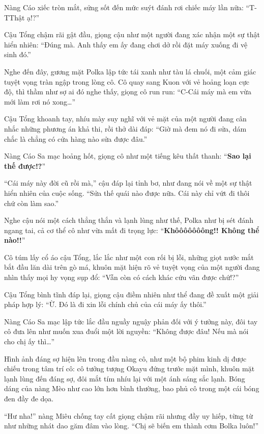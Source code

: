 \documentclass[../main.tex]{subfiles}
\begin{document}
Nàng Cáo xiếc tròn mắt, sửng sốt đến mức suýt đánh rơi chiếc máy lần nữa: ``T-TThật ạ!?''

Cậu Tổng chậm rãi gật đầu, giọng cậu như một người đang xác nhận một sự thật hiển nhiên: ``Đúng mà. Anh thấy em ấy đang chơi dở rồi đặt máy xuống đi vệ sinh đó.''

Nghe đến đây, gương mặt Polka lập tức tái xanh như tàu lá chuối, một cảm giác tuyệt vọng tràn ngập trong lòng cô. Cô quay sang Kuon với vẻ hoảng loạn cực độ, thì thầm như sợ ai đó nghe thấy, giọng cô run run: ``C-Cái máy mà em vừa mới làm rơi nó xong\dots''

Cậu Tổng khoanh tay, nhíu mày suy nghĩ với vẻ mặt của một người đang cân nhắc những phương án khả thi, rồi thở dài đáp: ``Giờ mà đem nó đi sửa, dám chắc là chẳng có cửa hàng nào sửa được đâu.''

Nàng Cáo Sa mạc hoảng hốt, giọng cô như một tiếng kêu thất thanh: ``\textbf{Sao lại thế được!?}''

``Cái máy này đời cũ rồi mà,'' cậu đáp lại tỉnh bơ, như đang nói về một sự thật hiển nhiên của cuộc sống. ``Sửa thế quái nào được nữa. Cái này chỉ vứt đi thôi chứ còn làm sao.''

Nghe cậu nói một cách thẳng thắn và lạnh lùng như thế, Polka như bị sét đánh ngang tai, cả cơ thể cô như vừa mất đi trọng lực: ``\textbf{Khôôôôôôông!! Không thể nào!!}''

Cô túm lấy cổ áo cậu Tổng, lắc lắc như một con rối bị lỗi, những giọt nước mắt bắt đầu lăn dài trên gò má, khuôn mặt hiện rõ vẻ tuyệt vọng của một người đang nhìn thấy mọi hy vọng sụp đổ: ``Vẫn còn có cách khác cứu vãn được chứ!?''

Cậu Tổng bình tĩnh đáp lại, giọng cậu điềm nhiên như thể đang đề xuất một giải pháp hợp lý: ``Ừ. Đó là đi xin lỗi chính chủ của cái máy ấy thôi.''

Nàng Cáo Sa mạc lập tức lắc đầu nguầy nguậy phản đối với ý tưởng này, đôi tay cô đưa lên như muốn xua đuổi một lời nguyền: ``Không được đâu! Nếu mà nói cho chị ấy thì\dots''

Hình ảnh đáng sợ hiện lên trong đầu nàng cô, như một bộ phim kinh dị được chiếu trong tâm trí cô: cô tưởng tượng Okayu đứng trước mặt mình, khuôn mặt lạnh lùng đến đáng sợ, đôi mắt tím nhíu lại với một ánh sáng sắc lạnh. Bóng dáng của nàng Mèo như cao lớn hơn bình thường, bao phủ cô trong một cái bóng đen đầy đe dọa.

``Hư nha!'' nàng Miêu chống tay cất giọng chậm rãi nhưng đầy uy hiếp, từng từ như những nhát dao găm đâm vào lòng. ``Chị sẽ biến em thành cơm Bolka luôn!''
\end{document}
